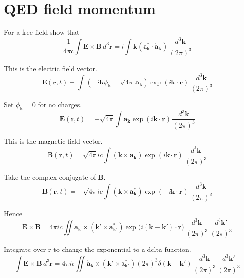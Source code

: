 


\section*{QED field momentum}

For a free field show that
\begin{equation*}
\frac{1}{4\pi c}\int\mathbf E\times\mathbf B\,d^3\mathbf r
=i\int\mathbf k\left(\mathbf a_{\mathbf k}^*\cdot\dot{\mathbf a}_{\mathbf k}\right)\,
\frac{d^3\mathbf k}{(2\pi)^3}
\end{equation*}

This is the electric field vector.
\begin{equation*}
\mathbf E(\mathbf r,t)
=\int\left(-i\mathbf k\phi_{\mathbf k}-\sqrt{4\pi}\,\dot{\mathbf a}_{\mathbf k}\right)
\exp(i\mathbf k\cdot\mathbf r)\,
\frac{d^3\mathbf k}{(2\pi)^3}
\end{equation*}

Set $\phi_{\mathbf k}=0$ for no charges.
\begin{equation*}
\mathbf E(\mathbf r,t)
=-\sqrt{4\pi}\int\dot{\mathbf a}_{\mathbf k}
\exp(i\mathbf k\cdot\mathbf r)\,
\frac{d^3\mathbf k}{(2\pi)^3}
\end{equation*}

This is the magnetic field vector.
\begin{equation*}
\mathbf B(\mathbf r,t)
=\sqrt{4\pi}ic\int(\mathbf k\times\mathbf a_{\mathbf k})
\exp(i\mathbf k\cdot\mathbf r)\,
\frac{d^3\mathbf k}{(2\pi)^3}
\end{equation*}

Take the complex conjugate of $\mathbf B$.
\begin{equation*}
\mathbf B(\mathbf r,t)
=-\sqrt{4\pi}ic\int(\mathbf k\times\mathbf a_{\mathbf k}^*)
\exp(-i\mathbf k\cdot\mathbf r)\,
\frac{d^3\mathbf k}{(2\pi)^3}
\end{equation*}

Hence
\begin{equation*}
\mathbf E\times\mathbf B
=4\pi ic\iint\dot{\mathbf a}_{\mathbf k}\times(\mathbf k'\times\mathbf a_{\mathbf k'}^*)
\exp\bigl(i(\mathbf k-\mathbf k')\cdot\mathbf r\bigr)
\,\frac{d^3\mathbf k}{(2\pi)^3}\,\frac{d^3\mathbf k'}{(2\pi)^3}
\end{equation*}

Integrate over $\mathbf r$ to change the exponential to a delta function.
\begin{equation*}
\int\mathbf E\times\mathbf B\,d^3\mathbf r
=4\pi ic\iint\dot{\mathbf a}_{\mathbf k}\times(\mathbf k'\times\mathbf a_{\mathbf k'}^*)
(2\pi)^3\delta(\mathbf k-\mathbf k')
\,\frac{d^3\mathbf k}{(2\pi)^3}\,\frac{d^3\mathbf k'}{(2\pi)^3}
\end{equation*}

